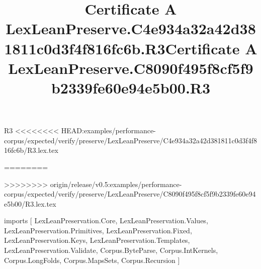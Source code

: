 \begin{lexlean}{R3}
<<<<<<<< HEAD:examples/performance-corpus/expected/verify/preserve/LexLeanPreserve/C4e934a32a42d381811c0d3f4f816fc6b/R3.lex.tex
\title{Certificate A LexLeanPreserve.C4e934a32a42d381811c0d3f4f816fc6b.R3}
========
\title{Certificate A LexLeanPreserve.C8090f495f8cf5f9b2339fe60e94e5b00.R3}
>>>>>>>> origin/release/v0.5:examples/performance-corpus/expected/verify/preserve/LexLeanPreserve/C8090f495f8cf5f9b2339fe60e94e5b00/R3.lex.tex
\begin{coremodule}
imports [
  LexLeanPreservation.Core,
  LexLeanPreservation.Values,
  LexLeanPreservation.Primitives,
  LexLeanPreservation.Fixed,
  LexLeanPreservation.Keys,
  LexLeanPreservation.Templates,
  LexLeanPreservation.Validate,
  Corpus.ByteParse,
  Corpus.IntKernels,
  Corpus.LongFolds,
  Corpus.MapsSets,
  Corpus.Recursion
]


\end{coremodule}
\end{lexlean}
